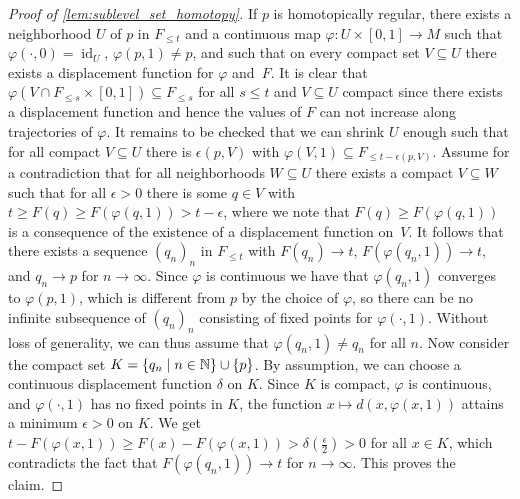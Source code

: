 \begin{proof}[Proof of \cref{lem:sublevel_set_homotopy}]
	If $p$ is homotopically regular, there exists a neighborhood $U$ of $p$ in $F_{\leq t}$ and a continuous map $\varphi \colon U \times [0,1] \to M$ such that $\varphi(\cdot,0) = \operatorname{id}_{U}$, $\varphi(p,1) \neq p$, and such that on every compact set $V \subseteq U$ there exists a displacement function for $\varphi$ and~$F$.
	It is clear that $\varphi(V \cap F_{\leq s} \times [0,1]) \subseteq F_{\leq s}$ for all $s \leq t$ and $V \subseteq U$ compact since there exists a displacement function and hence the values of $F$ can not increase along trajectories of $\varphi$.
	It remains to be checked that we can shrink $U$ enough such that for all compact $V \subseteq U$ there is $\epsilon(p,V)$ with $\varphi(V,1) \subseteq F_{\leq t - \epsilon(p,V)}$.
	Assume for a contradiction that for all neighborhoods $W \subseteq U$ there exists a compact $V \subseteq W$ such that for all $\epsilon > 0$ there is some $q \in V$ with $t \geq F(q) \geq F(\varphi(q,1)) > t - \epsilon$, where we note that $F(q) \geq F(\varphi(q,1))$ is a consequence of the existence of a displacement function on~$V$.
	It follows that there exists a sequence $(q_{n})_{n}$ in $F_{\leq t}$ with $F(q_{n}) \to t$, $F(\varphi(q_{n},1)) \to t$, and $q_{n} \to p$ for $n \to \infty$.
	Since $\varphi$ is continuous we have that $\varphi(q_{n},1)$ converges to $\varphi(p,1)$, which is different from $p$ by the choice of $\varphi$, so there can be no infinite subsequence of $(q_{n})_{n}$ consisting of fixed points for $\varphi(\cdot,1)$.
	Without loss of generality, we can thus assume that $\varphi(q_{n},1) \neq q_{n}$ for all $n$.
	Now consider the compact set $K = \{q_{n} \mid n \in \mathbb{N} \} \cup \{p\}$.
	By assumption, we can choose a continuous displacement function $\delta$ on $K$.
	Since $K$ is compact, $\varphi$ is continuous, %
	and $\varphi(\cdot,1)$ has no fixed points in $K$, the function $x \mapsto %
	d(x,\varphi(x,1))
	$ attains a minimum $\epsilon > 0$ on $K$. 
	We get $t - F(\varphi(x,1)) \geq F(x) - F(\varphi(x,1)) > \delta(\frac{\epsilon}{2}) > 0$ for all $x \in K$, which contradicts the fact that $F(\varphi(q_{n},1)) \to t$ for $n \to \infty$.
	This proves the claim.



\end{proof}
